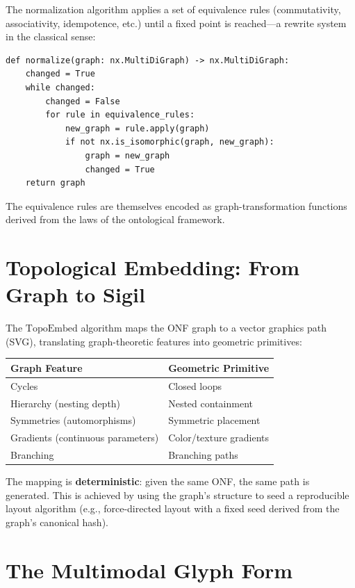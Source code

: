 \documentclass[12pt, letterpaper]{book}
\begin{document}
The normalization algorithm applies a set of equivalence rules (commutativity, associativity, idempotence, etc.) until a fixed point is reached---a rewrite system in the classical sense:

\begin{lstlisting}
def normalize(graph: nx.MultiDiGraph) -> nx.MultiDiGraph:
    changed = True
    while changed:
        changed = False
        for rule in equivalence_rules:
            new_graph = rule.apply(graph)
            if not nx.is_isomorphic(graph, new_graph):
                graph = new_graph
                changed = True
    return graph
\end{lstlisting}

The equivalence rules are themselves encoded as graph-transformation functions derived from the laws of the ontological framework.

\section{Topological Embedding: From Graph to Sigil}

The $\mathrm{TopoEmbed}$ algorithm maps the ONF graph to a vector graphics path (SVG), translating graph-theoretic features into geometric primitives:

\begin{center}
\begin{tabular}{ll}
\toprule
\textbf{Graph Feature} & \textbf{Geometric Primitive} \\
\midrule
Cycles & Closed loops \\
Hierarchy (nesting depth) & Nested containment \\
Symmetries (automorphisms) & Symmetric placement \\
Gradients (continuous parameters) & Color/texture gradients \\
Branching & Branching paths \\
\bottomrule
\end{tabular}
\end{center}

The mapping is \textbf{deterministic}: given the same ONF, the same path is generated. This is achieved by using the graph's structure to seed a reproducible layout algorithm (e.g., force-directed layout with a fixed seed derived from the graph's canonical hash).

\section{The Multimodal Glyph Form}
\end{document}
